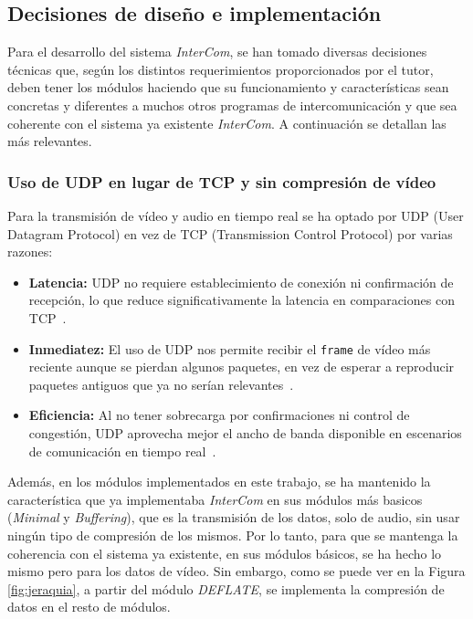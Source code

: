 \newpage

\subsection{Decisiones de diseño e implementación}

Para el desarrollo del sistema \textit{InterCom}, se han tomado diversas decisiones técnicas que, según los distintos requerimientos proporcionados por el tutor, deben tener los módulos haciendo que su funcionamiento y características sean concretas y diferentes a muchos otros programas de intercomunicación y que sea coherente con el sistema ya existente \textit{InterCom}. A continuación se detallan las más relevantes.

\subsubsection{Uso de UDP en lugar de TCP y sin compresión de vídeo}

Para la transmisión de vídeo y audio en tiempo real se ha optado por UDP (User Datagram Protocol) en vez de TCP (Transmission Control Protocol) por varias razones:

\begin{itemize} 
    \item \textbf{Latencia:} UDP no requiere establecimiento de conexión ni confirmación de recepción, lo que reduce significativamente la latencia en comparaciones con TCP~\cite{lpi}. 
    \item \textbf{Inmediatez:} El uso de UDP nos permite recibir el \texttt{frame} de vídeo más reciente aunque se pierdan algunos paquetes, en vez de esperar a reproducir paquetes antiguos que ya no serían relevantes~\cite{rfc768}. 
    \item \textbf{Eficiencia:} Al no tener sobrecarga por confirmaciones ni control de congestión, UDP aprovecha mejor el ancho de banda disponible en escenarios de comunicación en tiempo real~\cite{cloudflare_udp}. 
\end{itemize}

Además, en los módulos implementados en este trabajo, se ha mantenido la característica que ya implementaba \textit{InterCom} en sus módulos más basicos (\textit{Minimal} y \textit{Buffering}), que es la transmisión de los datos, solo de audio, sin usar ningún tipo de compresión de los mismos. Por lo tanto, para que se mantenga la coherencia con el sistema ya existente, en sus módulos básicos, se ha hecho lo mismo pero para los datos de vídeo. Sin embargo, como se puede ver en la Figura \ref{fig:jeraquia}, a partir del módulo \textit{DEFLATE}, se implementa la compresión de datos en el resto de módulos.

